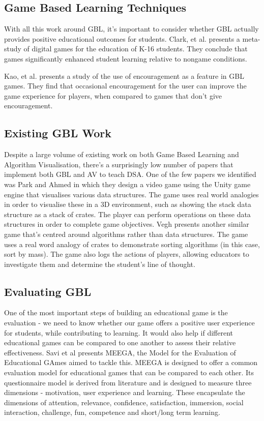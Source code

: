 \documentclass[10pt]{article}
\begin{document}
\subsection{Game Based Learning Techniques}
With all this work around GBL, it's important to consider whether GBL actually provides positive educational outcomes for students. Clark, et al. presents a meta-study of digital games for the education of K-16 students\cite{doi:10.3102/0034654315582065}. They conclude that games significantly enhanced student learning relative to nongame conditions.\par
Kao, et al. presents a study of the use of encouragement as a feature in GBL games. They find that occasional encouragement for the user can improve the game experience for players, when compared to games that don't give encouragement\cite{Kao:2016:EEE:2851581.2892335}.
\subsection{Existing GBL Work}
Despite a large volume of existing work on both Game Based Learning and Algorithm Visualisation, there's a surprisingly low number of papers that implement both GBL and AV to teach DSA. One of the few papers we identified was Park and Ahmed\cite{Park} in which they design a video game using the Unity game engine that visualises various data structures. The game uses real world analogies in order to visualise these in a 3D environment, such as showing the stack data structure as a stack of crates. The player can perform operations on these data structures in order to complete game objectives. Vegh\cite{vegh} presents another similar game that's centred around algorithms rather than data structures. The game uses a real word analogy of crates to demonstrate sorting algorithms (in this case, sort by mass). The game also logs the actions of players, allowing educators to investigate them and determine the student's line of thought.
\subsection{Evaluating GBL}
\label{meegalitrev}
One of the most important steps of building an educational game is the evaluation - we need to know whether our game offers a positive user experience for students, while contributing to learning. It would also help if different educational games can be compared to one another to assess their relative effectiveness. Savi et al presents MEEGA\cite{Rafael}\cite{meegaPlus}, the Model for the Evaluation of Educational GAmes aimed to tackle this. MEEGA is designed to offer a common evaluation model for educational games that can be compared to each other. Its questionnaire model is derived from literature and is designed to measure three dimensions - motivation, user experience and learning. These encapsulate the dimensions of attention, relevance, confidence, satisfaction, immersion, social interaction, challenge, fun, competence and short/long term learning.
\end{document}
